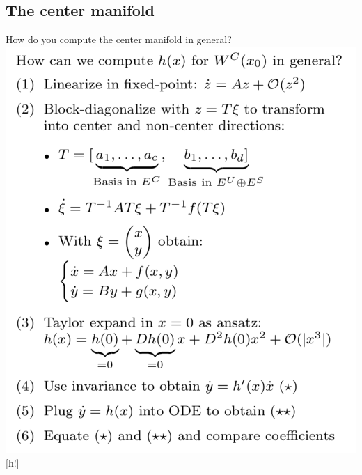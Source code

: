 \subsection{The center manifold}
How do you compute the center manifold in general?
\includegraphics[scale=0.5]{computeWc.png}[h!]


